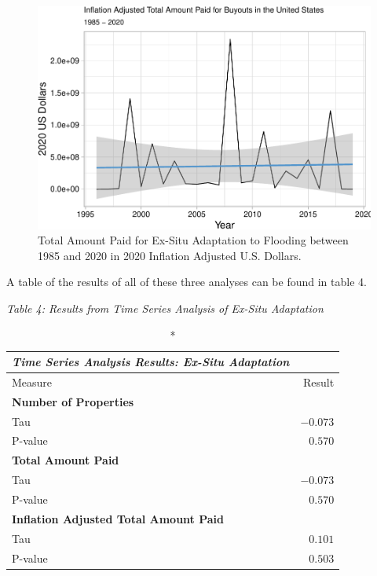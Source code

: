 \documentclass[
  12pt,
]{article}
\begin{document}
\begin{figure}
\centering
\includegraphics{finalreport_files/figure-latex/unnamed-chunk-16-1.pdf}
\caption{Total Amount Paid for Ex-Situ Adaptation to Flooding between
1985 and 2020 in 2020 Inflation Adjusted U.S. Dollars.}
\end{figure}

A table of the results of all of these three analyses can be found in
table 4.

\newpage

\emph{Table 4: Results from Time Series Analysis of Ex-Situ
Adaptation}\\
\captionsetup[table]{labelformat=empty,skip=1pt}

\begin{longtable}{lr}
\caption*{
{\large \emph{\textbf{Time Series Analysis Results: Ex-Situ Adaptation}}}
} \\ 
\toprule
Measure & Result \\ 
\midrule
\multicolumn{1}{l}{\textbf{Number of Properties}} \\ 
\midrule
Tau & $-0.073$ \\ 
P-value & $0.570$ \\ 
\midrule
\multicolumn{1}{l}{\textbf{Total Amount Paid}} \\ 
\midrule
Tau & $-0.073$ \\ 
P-value & $0.570$ \\ 
\midrule
\multicolumn{1}{l}{\textbf{Inflation Adjusted Total Amount Paid}} \\ 
\midrule
Tau & $0.101$ \\ 
P-value & $0.503$ \\ 
\bottomrule
\end{longtable}
\end{document}
